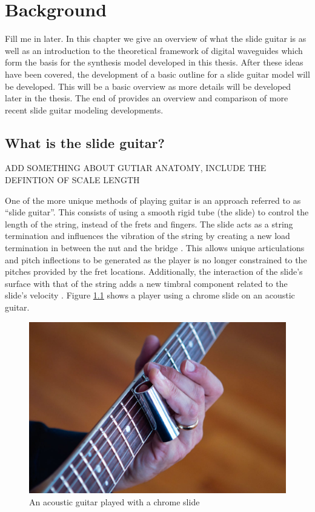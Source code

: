 \documentclass[main.tex]{subfiles}
\begin{document}
\chapter{Background}
Fill me in later.
In this chapter we give an overview of what the slide guitar is as well as an introduction to the theoretical framework of digital waveguides which form the basis for the synthesis model developed in this thesis. After these ideas have been covered, the development of a basic outline for a slide guitar model will be developed. This will be a basic overview as more details will be developed later in the thesis. The end of provides an overview and comparison of more recent slide guitar modeling developments.

\section{What is the slide guitar?}
ADD SOMETHING ABOUT GUTIAR ANATOMY, INCLUDE THE DEFINTION OF SCALE LENGTH

One of the more unique methods of playing guitar is an approach referred to as “slide guitar”. This consists of using a smooth rigid tube (the slide) to control the length of the string, instead of the frets and fingers. The slide acts as a string termination and influences the vibration of the string by creating a new load termination in between the nut and the bridge . This allows unique articulations and pitch inflections to be generated as the player is no longer constrained to the pitches provided by the fret locations. Additionally, the interaction of the slide’s surface with that of the string adds a new timbral component related to the slide’s velocity . Figure \ref{fig:acoustic_chrome} shows a player using a chrome slide on an acoustic guitar.

\begin{figure}[h]
    \centering
    \includegraphics[scale=.30]{./images/pictures/Slide-guitar-1024x683.jpg}
    \caption{An acoustic guitar played with a chrome slide}
    \label{fig:acoustic_chrome}
\end{figure}
\end{document}
